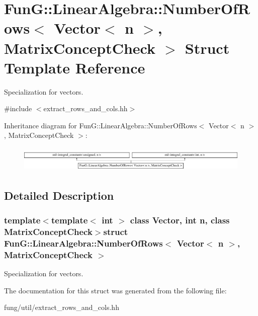\hypertarget{structFunG_1_1LinearAlgebra_1_1NumberOfRows_3_01Vector_3_01n_01_4_00_01MatrixConceptCheck_01_4}{\section{Fun\-G\-:\-:Linear\-Algebra\-:\-:Number\-Of\-Rows$<$ Vector$<$ n $>$, Matrix\-Concept\-Check $>$ Struct Template Reference}
\label{structFunG_1_1LinearAlgebra_1_1NumberOfRows_3_01Vector_3_01n_01_4_00_01MatrixConceptCheck_01_4}
}


Specialization for vectors.  




{\ttfamily \#include $<$extract\-\_\-rows\-\_\-and\-\_\-cols.\-hh$>$}

Inheritance diagram for Fun\-G\-:\-:Linear\-Algebra\-:\-:Number\-Of\-Rows$<$ Vector$<$ n $>$, Matrix\-Concept\-Check $>$\-:\begin{figure}[H]
\begin{center}
\leavevmode
\includegraphics[height=1.238938cm]{structFunG_1_1LinearAlgebra_1_1NumberOfRows_3_01Vector_3_01n_01_4_00_01MatrixConceptCheck_01_4}
\end{center}
\end{figure}


\subsection{Detailed Description}
\subsubsection*{template$<$template$<$ int $>$ class Vector, int n, class Matrix\-Concept\-Check$>$struct Fun\-G\-::\-Linear\-Algebra\-::\-Number\-Of\-Rows$<$ Vector$<$ n $>$, Matrix\-Concept\-Check $>$}

Specialization for vectors. 

The documentation for this struct was generated from the following file\-:\begin{DoxyCompactItemize}
\item 
fung/util/extract\-\_\-rows\-\_\-and\-\_\-cols.\-hh\end{DoxyCompactItemize}
